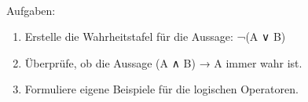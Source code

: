\documentclass[
  11pt,
  a4paper,
  DIV=11,
  numbers=noendperiod]{scrartcl}
\makeatletter
\let\oldparagraph\paragraph
\renewcommand{\paragraph}{
    \@ifstar
      \xxxParagraphStar
      \xxxParagraphNoStar
  }
\newcommand{\xxxParagraphStar}[1]{\oldparagraph*{#1}\mbox{}}
\newcommand{\xxxParagraphNoStar}[1]{\oldparagraph{#1}\mbox{}}
\providecommand{\tightlist}{%
  \setlength{\itemsep}{0pt}\setlength{\parskip}{0pt}}\usepackage{longtable,booktabs,array}
\makeatother
\begin{document}
\paragraph{Aufgaben:}\label{aufgaben}

\begin{enumerate}
\def\labelenumi{\arabic{enumi}.}
\tightlist
\item
  Erstelle die Wahrheitstafel für die Aussage: ¬(A ∨ B)
\item
  Überprüfe, ob die Aussage (A ∧ B) → A immer wahr ist.
\item
  Formuliere eigene Beispiele für die logischen Operatoren.
\end{enumerate}
\end{document}
